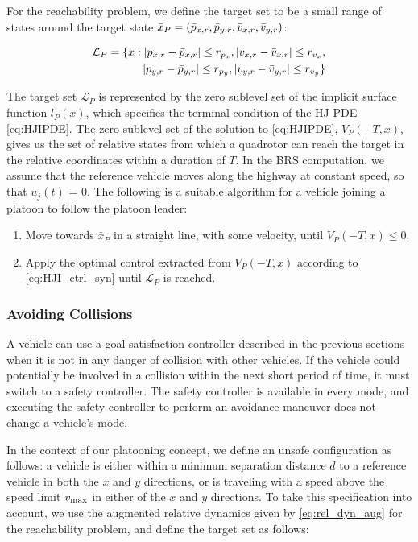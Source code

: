 For the reachability problem, we define the target set to be a small range of states around the target state $\bar x_P = (\bar{p}_{x,r}, \bar{p}_{y,r}, \bar{v}_{x,r}, \bar{v}_{y,r})$:

\begin{equation}
\begin{aligned}
\mathcal{L}_P = \{x: |p_{x,r}-\bar{p}_{x,r}|\le r_{p_x}, |v_{x,r}-\bar{v}_{x,r}|\le r_{v_x}, \\
|p_{y,r} - \bar{p}_{y,r}| \le r_{p_y}, |v_{y,r} - \bar{v}_{y,r}|\le r_{v_y} \}
\end{aligned}
\end{equation}

The target set $\mathcal{L}_P$ is represented by the zero sublevel set of the implicit surface function $l_P(x)$, which specifies the terminal condition of the HJ PDE \eqref{eq:HJIPDE}. The zero sublevel set of the solution to \eqref{eq:HJIPDE}, $V_P(-T,x)$, gives us the set of relative states from which a quadrotor can reach the target in the relative coordinates within a duration of $T$. In the BRS computation, we assume that the reference vehicle moves along the highway at constant speed, so that $u_j(t)$ = 0. The following is a suitable algorithm for a vehicle joining a platoon to follow the platoon leader:

\begin{enumerate}
\item Move towards $\bar{x}_P$ in a straight line, with some velocity, until $V_P(-T,x)\le 0$.
\item Apply the optimal control extracted from $V_P(-T,x)$ according to \eqref{eq:HJI_ctrl_syn} until $\mathcal{L}_P$ is reached.
\end{enumerate}

\subsubsection{Avoiding Collisions \label{sec:collision_ctrl}}
A vehicle can use a goal satisfaction controller described in the previous sections when it is not in any danger of collision with other vehicles. If the vehicle could potentially be involved in a collision within the next short period of time, it must switch to a safety controller. The safety controller is available in every mode, and executing the safety controller to perform an avoidance maneuver does not change a vehicle's mode. 

In the context of our platooning concept, we define an unsafe configuration as follows: a vehicle is either within a minimum separation distance $d$ to a reference vehicle in both the $x$ and $y$ directions, or is traveling with a speed above the speed limit $v_\text{max}$ in either of the $x$ and $y$ directions. To take this specification into account, we use the augmented relative dynamics given by \eqref{eq:rel_dyn_aug} for the reachability problem, and define the target set as follows:

